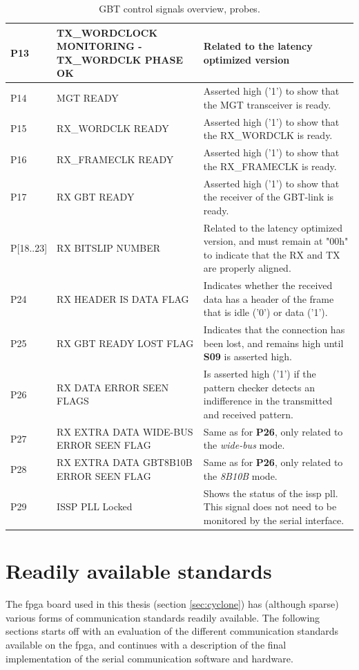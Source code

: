 \documentclass[main.tex]{subfiles}
\begin{document}
\begin{table}[H]
\begin{center}
\begin{tabular}{| l | p{5cm} | p{8cm} |}
  \hline
  P13     & TX\_WORDCLOCK MONITORING - TX\_WORDCLK PHASE OK & Related to the latency optimized version \\    
  \hline
  P14       & MGT READY             & Asserted high ('1') to show that the MGT transceiver is ready. \\
  \hline
  P15       & RX\_WORDCLK READY         & Asserted high ('1') to show that the RX\_WORDCLK is ready. \\
  \hline
  P16       & RX\_FRAMECLK READY        & Asserted high ('1') to show that the RX\_FRAMECLK is ready. \\
  \hline
  P17       & RX GBT READY            & Asserted high ('1') to show that the receiver of the GBT-link is ready. \\
  \hline
  P[18..23]   & RX BITSLIP NUMBER         & Related to the latency optimized version, and must remain at "00h" to indicate that the RX and TX are properly aligned. \\
  \hline
  P24       & RX HEADER IS DATA FLAG      & Indicates whether the received data has a header of the frame that is idle ('0') or data ('1'). \\
  \hline
  P25       & RX GBT READY LOST FLAG      & Indicates that the connection has been lost, and remains high until \textbf{S09} is asserted high.\\
  \hline
  P26       & RX DATA ERROR SEEN FLAGS      & Is asserted high ('1') if the pattern checker detects an indifference in the transmitted and received pattern. \\
  \hline
  P27       & RX EXTRA DATA WIDE-BUS ERROR SEEN FLAG      & Same as for \textbf{P26}, only related to the \textit{wide-bus} mode. \\  
  \hline
  P28       & RX EXTRA DATA GBT8B10B ERROR SEEN FLAG      & Same as for \textbf{P26}, only related to the \textit{8B10B} mode. \\
  \hline  
  P29     & ISSP PLL Locked             & Shows the status of the issp pll. This signal does not need to be monitored by the serial interface. \\
  \hline     
  \end{tabular}  
  \caption{GBT control signals overview, probes.}
  \label{tab:probe}
\end{center}
\end{table}

\section{Readily available standards}
The \gls{fpga} board used in this thesis (section \ref{sec:cyclone}) has (although sparse) various forms of communication standards readily available. The following sections starts off with an evaluation of the different communication standards available on the \gls{fpga}, and continues with a description of the final implementation of the serial communication software and hardware.\\
\end{document}
